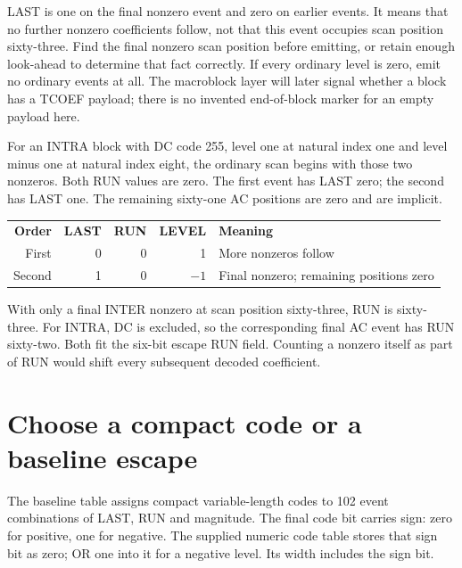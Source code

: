 LAST is one on the final nonzero event and zero on earlier events. It means
that no further nonzero coefficients follow, not that this event occupies scan
position sixty-three. Find the final nonzero scan position before emitting, or
retain enough look-ahead to determine that fact correctly. If every ordinary
level is zero, emit no ordinary events at all. The macroblock layer will later
signal whether a block has a TCOEF payload; there is no invented end-of-block
marker for an empty payload here.

For an INTRA block with DC code 255, level one at natural index one and level
minus one at natural index eight, the ordinary scan begins with those two
nonzeros. Both RUN values are zero. The first event has LAST zero; the second
has LAST one. The remaining sixty-one AC positions are zero and are implicit.

\begin{center}
\begin{tabular}{rrrrl}
\textbf{Order} & \textbf{LAST} & \textbf{RUN} & \textbf{LEVEL} & \textbf{Meaning}\\
First & 0 & 0 & 1 & More nonzeros follow\\
Second & 1 & 0 & $-1$ & Final nonzero; remaining positions zero
\end{tabular}
\end{center}
With only a final INTER nonzero at scan position sixty-three, RUN is sixty-three.
For INTRA, DC is excluded, so the corresponding final AC event has RUN sixty-two.
Both fit the six-bit escape RUN field. Counting a nonzero itself as part of RUN
would shift every subsequent decoded coefficient.

\section{Choose a compact code or a baseline escape}
The baseline table assigns compact variable-length codes to 102 event combinations
of LAST, RUN and magnitude. The final code bit carries sign: zero for positive,
one for negative. The supplied numeric code table stores that sign bit as zero;
OR one into it for a negative level. Its width includes the sign bit.

